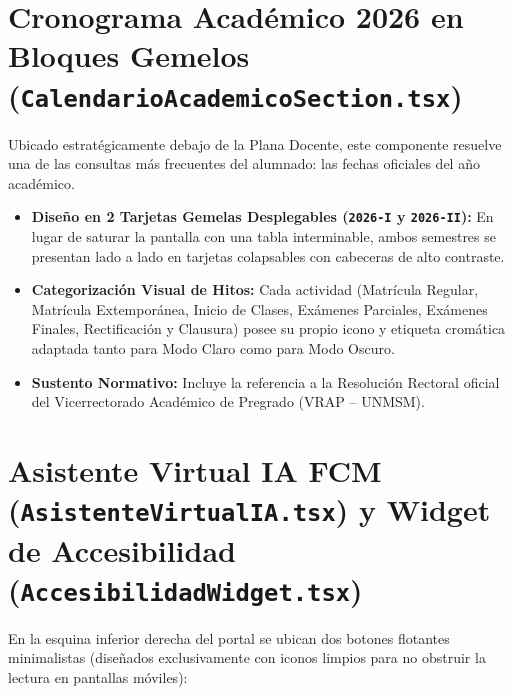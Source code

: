 \documentclass[12pt,a4paper,oneside]{report}
\begin{document}
\section{Cronograma Académico 2026 en Bloques Gemelos (\texttt{CalendarioAcademicoSection.tsx})}
Ubicado estratégicamente debajo de la Plana Docente, este componente resuelve una de las consultas más frecuentes del alumnado: las fechas oficiales del año académico.
\begin{itemize}[leftmargin=1.0cm]
  \item \textbf{Diseño en 2 Tarjetas Gemelas Desplegables (\texttt{2026-I} y \texttt{2026-II}):} En lugar de saturar la pantalla con una tabla interminable, ambos semestres se presentan lado a lado en tarjetas colapsables con cabeceras de alto contraste.
  \item \textbf{Categorización Visual de Hitos:} Cada actividad (Matrícula Regular, Matrícula Extemporánea, Inicio de Clases, Exámenes Parciales, Exámenes Finales, Rectificación y Clausura) posee su propio icono y etiqueta cromática adaptada tanto para Modo Claro como para Modo Oscuro.
  \item \textbf{Sustento Normativo:} Incluye la referencia a la Resolución Rectoral oficial del Vicerrectorado Académico de Pregrado (VRAP -- UNMSM).
\end{itemize}

\section{Asistente Virtual IA FCM (\texttt{AsistenteVirtualIA.tsx}) y Widget de Accesibilidad (\texttt{AccesibilidadWidget.tsx})}
En la esquina inferior derecha del portal se ubican dos botones flotantes minimalistas (diseñados exclusivamente con iconos limpios para no obstruir la lectura en pantallas móviles):
\end{document}
